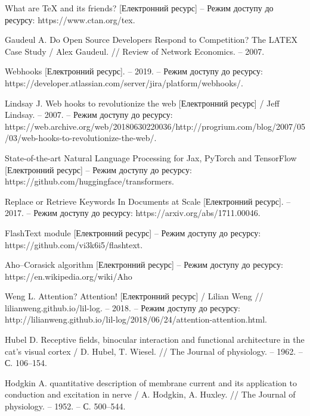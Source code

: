 \renewcommand\bibname{ПЕРЕЛІК ДЖЕРЕЛ ПОСИЛАННЯ}
\begin{thebibliography}{9}
    What are TeX and its friends? [Електронний ресурс] – Режим доступу до ресурсу: https://www.ctan.org/tex.

    Gaudeul A. Do Open Source Developers Respond to Competition? The LATEX Case Study / Alex Gaudeul. // Review of Network Economics. – 2007.

    Webhooks [Електронний ресурс]. – 2019. – Режим доступу до ресурсу: https://developer.atlassian.com/server/jira/platform/webhooks/.

    Lindsay J. Web hooks to revolutionize the web [Електронний ресурс] / Jeff Lindsay. – 2007. – Режим доступу до ресурсу: https://web.archive.org/web/20180630220036/http://progrium.com/blog/2007/05/03/web-hooks-to-revolutionize-the-web/.
    
    State-of-the-art Natural Language Processing for Jax, PyTorch and TensorFlow [Електронний ресурс] – Режим доступу до ресурсу: https://github.com/huggingface/transformers.

    Replace or Retrieve Keywords In Documents at Scale [Електронний ресурс]. – 2017. – Режим доступу до ресурсу: https://arxiv.org/abs/1711.00046.

    FlashText module [Електронний ресурс] – Режим доступу до ресурсу: https://github.com/vi3k6i5/flashtext.

    Aho–Corasick algorithm [Електронний ресурс] – Режим доступу до ресурсу: https://en.wikipedia.org/wiki/Aho%

    Weng L. Attention? Attention! [Електронний ресурс] / Lilian Weng // lilianweng.github.io/lil-log. – 2018. – Режим доступу до ресурсу: http://lilianweng.github.io/lil-log/2018/06/24/attention-attention.html.

    Hubel D. Receptive fields, binocular interaction and functional architecture in the cat’s visual cortex / D. Hubel, T. Wiesel. // The Journal of physiology. – 1962. – С. 106–154.

    Hodgkin A. quantitative description of membrane current and its application to conduction and excitation in nerve / A. Hodgkin, A. Huxley. // The Journal of physiology. – 1952. – С. 500–544.

\end{thebibliography}